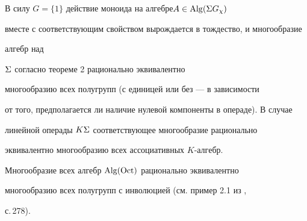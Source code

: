 




\begin{exam}


В силу $G=\{1\}$ действие моноида на алгебре\linebreak $A \in \operatorname{Alg}(\Sigma G_{\chi})$


вместе с соответствующим свойством вырождается в тождество, и многообразие


алгебр над


$\Sigma$ согласно теореме 2 рационально эквивалентно


многообразию всех полугрупп (с единицей или без --- в зависимости


от того, предполагается ли наличие нулевой компоненты в операде). В случае


линейной операды $K\Sigma$ соответствующее многообразие рационально


эквивалентно многообразию всех ассоциативных $K$-алгебр.


\end{exam}





\begin{exam}


Многообразие всех алгебр $\operatorname{Alg}(\operatorname{Oct})$ рационально эквивалентно


многообразию всех полугрупп с инволюцией (см. пример 2.1 из \cite{Kap},


с.\,278).


\end{exam}








